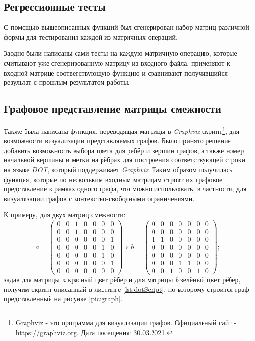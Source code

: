 \documentclass[14pt]{matmex-diploma}
\begin{document}
\subsection{Регрессионные тесты}
С помощью вышеописанных функций был сгенерирован набор матриц различной формы для тестирования 
каждой из матричных операций.

Заодно были написаны сами тесты на каждую матричную операцию, которые 
считывают уже сгенерированную матрицу из входного файла,
применяют к входной матрице соответствующую функцию и сравнивают получившийся результат с прошлым результатом работы.

\subsection{Графовое представление матрицы смежности}
Также была написана функция, переводящая матрицы в \textit{Graphviz} скрипт\footnote{
Graphviz - это программа для визуализации графов.
Официальный сайт - https://graphviz.org. Дата посещения: 30.03.2021.
},
для возможности визуализации представляемых графов.
Было принято решение добавить возможность выбора цвета для ребёр и вершин графов,
а также номер начальной вершины и метки на рёбрах для построения соответствующей строки на языке \textit{DOT},
который поддерживает \textit{Graphviz}.
Таким образом получилась функция, которые по нескольким входным матрицам строит их графовое представление в рамках одного графа,
что можно использовать, в частности, для визуализации графов с контекстно-свободными ограничениями.

К примеру, для двух матриц смежности:
$$a = 
\begin{pmatrix}
  0& 0& 1& 0& 0& 0& 0\\
  0& 0& 1& 0& 0& 0& 0\\
  0& 0& 0& 0& 0& 0& 1\\
  0& 0& 0& 0& 0& 1& 0\\
  0& 0& 0& 0& 0& 1& 0\\
  0& 0& 0& 0& 0& 0& 1\\
  0& 0& 0& 0& 0& 0& 0
\end{pmatrix} \text{ и }
b = 
\begin{pmatrix}
  0& 0& 0& 0& 0& 0& 0\\
  0& 0& 0& 0& 0& 0& 0\\
  1& 1& 0& 0& 0& 0& 0\\
  0& 0& 0& 0& 0& 0& 0\\
  0& 0& 0& 0& 0& 0& 0\\
  0& 0& 0& 1& 1& 0& 0\\
  0& 0& 1& 0& 0& 1& 0
\end{pmatrix}\text{;}
$$
задав для матрицы \textit{a} красный цвет рёбер и для матрицы \textit{b} зелёный цвет рёбер,
получим скрипт описанный в листинге \ref{lst:dotScript}, по которому строится граф представленный на рисунке \ref{pic:graph}.
\end{document}
